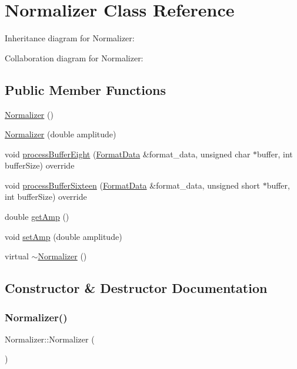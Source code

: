 \hypertarget{classNormalizer}{}\section{Normalizer Class Reference}
\label{classNormalizer}


Inheritance diagram for Normalizer\+:


Collaboration diagram for Normalizer\+:
\subsection*{Public Member Functions}
\begin{DoxyCompactItemize}
\item 
\hyperlink{classNormalizer_af576151323854ff0d4d7e37255c397d1}{Normalizer} ()
\item 
\hyperlink{classNormalizer_a9178648f9e33be07b9740c64af552efe}{Normalizer} (double amplitude)
\item 
void \hyperlink{classNormalizer_aff7ce2273db142a9a8b5d37dd0ef1c1c}{process\+Buffer\+Eight} (\hyperlink{structFormatData}{Format\+Data} \&format\+\_\+data, unsigned char $\ast$buffer, int buffer\+Size) override
\item 
void \hyperlink{classNormalizer_a50b7b5b618cb4721d4c34d1bb719ed02}{process\+Buffer\+Sixteen} (\hyperlink{structFormatData}{Format\+Data} \&format\+\_\+data, unsigned short $\ast$buffer, int buffer\+Size) override
\item 
double \hyperlink{classNormalizer_a919c2540717d44dc354f8fed1d56b891}{get\+Amp} ()
\item 
void \hyperlink{classNormalizer_a10e2783584e74931017b08c536b53048}{set\+Amp} (double amplitude)
\item 
virtual \hyperlink{classNormalizer_aa6437195b1223879aa1f14f211a965b5}{$\sim$\+Normalizer} ()
\end{DoxyCompactItemize}


\subsection{Constructor \& Destructor Documentation}
\mbox{\label{classNormalizer_af576151323854ff0d4d7e37255c397d1}} 
\subsubsection{\texorpdfstring{Normalizer()}{Normalizer()}\hspace{0.1cm}{\footnotesize\ttfamily [1/2]}}
{\footnotesize\ttfamily Normalizer\+::\+Normalizer (\begin{DoxyParamCaption}{ }\end{DoxyParamCaption})}

